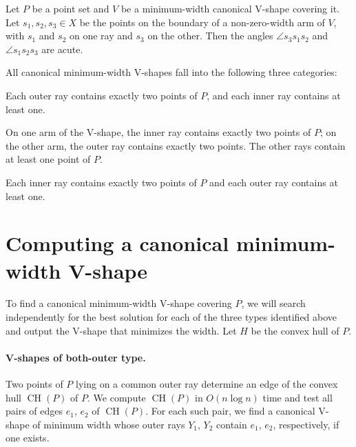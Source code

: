 \documentclass{llncs}
\DeclareMathOperator{\conv}{CH}
\begin{document}
\begin{corollary}
  \label{Cor:angle}
  Let $P$ be a point set and $V$ be a minimum-width canonical V-shape
  covering it.  Let $s_1, s_2, s_3 \in X$ be the points on the
  boundary of a non-zero-width arm of $V$, with $s_1$ and $s_2$ on one
  ray and $s_3$ on the other.  Then the angles $\angle s_3 s_1 s_2$
  and $\angle s_1 s_2 s_3$ are acute.
\end{corollary}



All canonical minimum-width V-shapes fall into the following three
categories: \begin{description}\itemsep 0pt \parsep 0pt \parskip 0pt
\item[both-outer] Each outer ray contains exactly two points of $P$, and each
  inner ray contains at least one. 
\item[inner-outer] On one arm of the V-shape, the inner ray contains exactly two points of $P$; on the other
  arm, the outer ray contains exactly two points. The other rays contain at least one point of $P$.
\item[both-inner] Each inner ray contains exactly two points of $P$ and each outer 
  ray contains at least one.
\end{description}

\section{Computing a canonical minimum-width V-shape}
\label{sec:algorithm}

To find a canonical minimum-width V-shape covering $P$, we will search
independently for the best solution for each of the three types identified
above and output the V-shape that minimizes the width.  Let $H$ be the
convex hull of $P$.

\paragraph*{V-shapes of both-outer type.}




\iffalse
Two points of $P$ lying on a common outer ray determine an edge of the
convex hull $\conv(P)$ of $P$.  We compute $\conv(P)$ in $O(n \log n)$
time \cite{ComputationalGeometry} and test all pairs of edges $e_1$,
$e_2$ of $\conv(P)$.  For each such pair, we find a canonical V-shape of
minimum width whose outer rays $Y_1$, $Y_2$ contain $e_1$, $e_2$,
respectively, if one exists.
\end{document}
